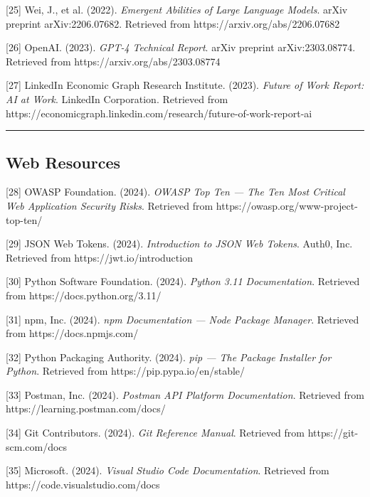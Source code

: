 \documentclass[12pt]{article}
\begin{document}
[25] Wei, J., et al. (2022). \textit{Emergent Abilities of Large Language Models}. arXiv preprint arXiv:2206.07682. Retrieved from https://arxiv.org/abs/2206.07682

[26] OpenAI. (2023). \textit{GPT-4 Technical Report}. arXiv preprint arXiv:2303.08774. Retrieved from https://arxiv.org/abs/2303.08774

[27] LinkedIn Economic Graph Research Institute. (2023). \textit{Future of Work Report: AI at Work}. LinkedIn Corporation. Retrieved from https://economicgraph.linkedin.com/research/future-of-work-report-ai

\noindent\rule{\textwidth}{0.4pt}

\subsection{Web Resources}

[28] OWASP Foundation. (2024). \textit{OWASP Top Ten — The Ten Most Critical Web Application Security Risks}. Retrieved from https://owasp.org/www-project-top-ten/

[29] JSON Web Tokens. (2024). \textit{Introduction to JSON Web Tokens}. Auth0, Inc. Retrieved from https://jwt.io/introduction

[30] Python Software Foundation. (2024). \textit{Python 3.11 Documentation}. Retrieved from https://docs.python.org/3.11/

[31] npm, Inc. (2024). \textit{npm Documentation — Node Package Manager}. Retrieved from https://docs.npmjs.com/

[32] Python Packaging Authority. (2024). \textit{pip — The Package Installer for Python}. Retrieved from https://pip.pypa.io/en/stable/

[33] Postman, Inc. (2024). \textit{Postman API Platform Documentation}. Retrieved from https://learning.postman.com/docs/

[34] Git Contributors. (2024). \textit{Git Reference Manual}. Retrieved from https://git-scm.com/docs

[35] Microsoft. (2024). \textit{Visual Studio Code Documentation}. Retrieved from https://code.visualstudio.com/docs
\end{document}
